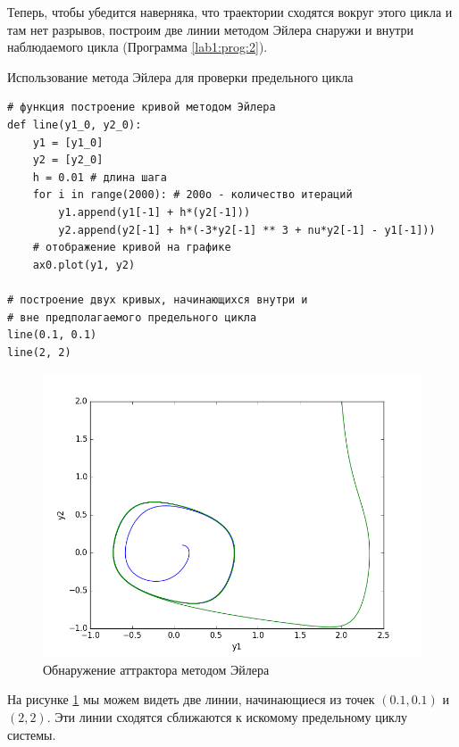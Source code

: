 Теперь, чтобы убедится наверняка, что траектории сходятся вокруг этого цикла 
и там нет разрывов, построим две линии методом Эйлера снаружи и внутри наблюдаемого
цикла (Программа \ref{lab1:prog:2}).

\begin{program}
  \caption{Использование метода Эйлера для проверки предельного цикла}
  \label{lab1:prog:2}
  \begin{verbatim}
# функция построение кривой методом Эйлера
def line(y1_0, y2_0):
    y1 = [y1_0]
    y2 = [y2_0]
    h = 0.01 # длина шага
    for i in range(2000): # 200o - количество итераций
        y1.append(y1[-1] + h*(y2[-1]))
        y2.append(y2[-1] + h*(-3*y2[-1] ** 3 + nu*y2[-1] - y1[-1]))
    # отображение кривой на графике
    ax0.plot(y1, y2)

# построение двух кривых, начинающихся внутри и 
# вне предполагаемого предельного цикла
line(0.1, 0.1)
line(2, 2)
  \end{verbatim}
\end{program}

\clearpage

\begin{figure}[thp]
  \centering
  \includegraphics[width=\textwidth]{figures/1_cycle}
  \caption{Обнаружение аттрактора методом Эйлера}
  \label{lab1:cycle}
\end{figure}

На рисунке \ref{lab1:cycle} мы можем видеть две линии, начинающиеся из точек $(0.1, 0.1)$
и $(2, 2)$. Эти линии сходятся сближаются к искомому предельному циклу системы.
